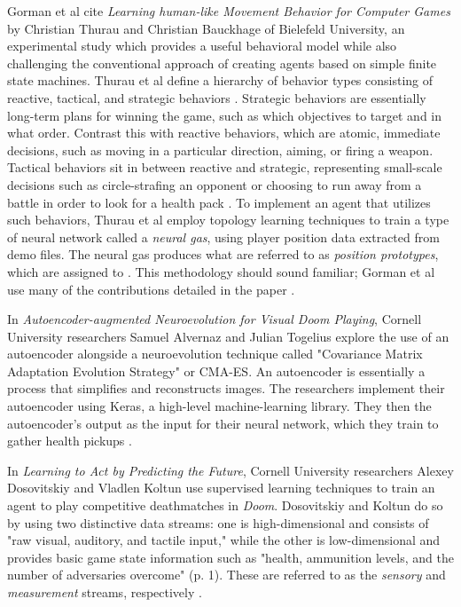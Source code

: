 Gorman et al cite {\it Learning human-like Movement Behavior for Computer Games} by Christian Thurau and Christian Bauckhage of Bielefeld University, an experimental study which provides a useful behavioral model while also challenging the conventional approach of creating agents based on simple finite state machines. Thurau et al define a hierarchy of behavior types consisting of reactive, tactical, and strategic behaviors \cite{Thurau:2004}. Strategic behaviors are essentially long-term plans for winning the game, such as which objectives to target and in what order. Contrast this with reactive behaviors, which are atomic, immediate decisions, such as moving in a particular direction, aiming, or firing a weapon. Tactical behaviors sit in between reactive and strategic, representing small-scale decisions such as circle-strafing an opponent or choosing to run away from a battle in order to look for a health pack \cite{Gorman:2006}. To implement an agent that utilizes such behaviors, Thurau et al employ topology learning techniques to train a type of neural network called a {\it neural gas}, using player position data extracted from demo files. The neural gas produces what are referred to as {\it position prototypes}, which are assigned to . This methodology should sound familiar; Gorman et al use many of the contributions detailed in the paper \cite{Thurau:2004}.

In {\it Autoencoder-augmented Neuroevolution for Visual Doom Playing}, Cornell University researchers Samuel Alvernaz and Julian Togelius explore the use of an autoencoder alongside a neuroevolution technique called "Covariance Matrix Adaptation Evolution Strategy" or CMA-ES. An autoencoder is essentially a process that simplifies and reconstructs images. The researchers implement their autoencoder using Keras, a high-level machine-learning library. They then the autoencoder's output as the input for their neural network, which they train to gather health pickups \cite{Alvernaz:2017}.

In {\it Learning to Act by Predicting the Future}, Cornell University researchers Alexey Dosovitskiy and Vladlen Koltun use supervised learning techniques to train an agent to play competitive deathmatches in {\it Doom}. Dosovitskiy and Koltun do so by using two distinctive data streams: one is high-dimensional and consists of "raw visual, auditory, and tactile input," while the other is low-dimensional and provides basic game state information such as "health, ammunition levels, and the number of adversaries overcome" (p. 1). These are referred to as the {\it sensory} and {\it measurement} streams, respectively \cite{Dosovitskiy:2016}.

